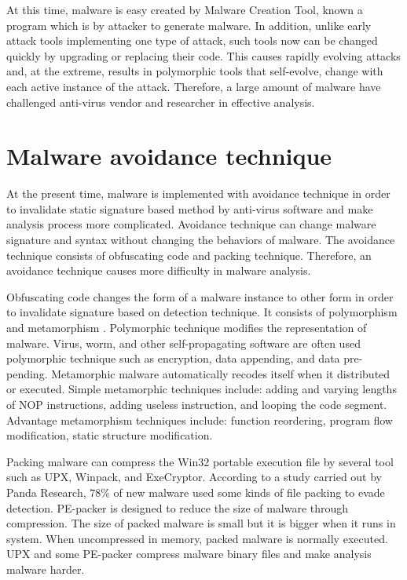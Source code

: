 At this time, malware is easy created by Malware Creation Tool, known a program which is by attacker to generate malware\cite{Microsoft}. In addition, unlike early attack tools implementing one type of attack, such tools now can be changed quickly by upgrading or replacing their code. This causes rapidly evolving attacks and, at the extreme, results in polymorphic tools that self-evolve, change with each active instance of the attack. Therefore, a large amount of malware have challenged anti-virus vendor and researcher in effective analysis.

\section{Malware avoidance technique}

At the present time, malware is implemented with avoidance technique in order to invalidate static signature based method by anti-virus software and make analysis process more complicated. Avoidance technique can change malware signature and syntax without changing the behaviors of malware. The avoidance technique consists of obfuscating code and packing technique. Therefore, an avoidance technique causes more difficulty in malware analysis. 
 
Obfuscating code changes the form of a malware instance to other form in order to invalidate signature based on detection technique. It consists of polymorphism and metamorphism \cite{blackhat1}. Polymorphic technique modifies the representation of malware. Virus, worm, and other self-propagating software are often used polymorphic technique such as encryption, data appending, and data pre-pending.  Metamorphic malware automatically recodes itself when it distributed or executed\cite{blackhat1}. Simple metamorphic techniques include: adding and varying lengths of NOP instructions, adding useless instruction, and looping the code segment. Advantage metamorphism techniques include: function reordering, program flow modification, static structure modification.

Packing malware can compress the Win32 portable execution file by several tool such as UPX, Winpack, and ExeCryptor. According to a study carried out by Panda Research, $78$\% of new malware used some kinds of file packing to evade detection. PE-packer is designed to reduce the size of malware through compression. The size of packed malware is small but it is bigger when it runs in system\cite{packing}. When uncompressed in memory, packed malware is normally executed. UPX and some PE-packer compress malware binary files and make analysis malware harder.

